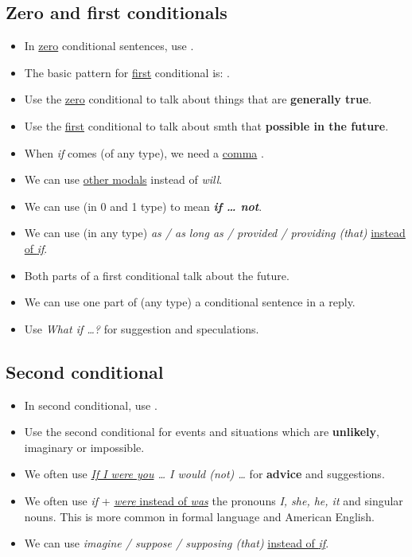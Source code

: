 \subsection{Zero and first conditionals}
\begin{itemize}
    \item In \underline{zero} conditional sentences, use .
    \item The basic pattern for \underline{first} conditional is:
    .
    \item Use the \underline{zero} conditional to talk about things that are \textbf{generally true}.
    \item Use the \underline{first} conditional to talk about smth that \textbf{possible in the future}.
    \item When \textit{if} comes  (of any type), we need a \underline{comma} .
    \item We can use \underline{other modals} instead of \textit{will}.
    \item We can use  (in 0 and 1 type) to mean \textbf{\textit{if \ldots{} not}}.
    \item[\doot] We can use (in any type) \textit{as / as long as / provided / providing (that)} \underline{instead of \textit{if}}.
    \item[\ast] Both parts of a first conditional talk about the future.
    \item[\aast] We can use one part of (any type) a conditional sentence in a reply.
    \item[\aast] Use \textit{What if \ldots{}?} for suggestion and speculations.
\end{itemize}

\subsection{Second conditional}
\begin{itemize}
    \item In second conditional, use .
    \item Use the second conditional for events and situations which are \textbf{unlikely}, imaginary or impossible.
    \item We often use \textit{\underline{If I were you} \ldots{} I would (not) \ldots} for \textbf{advice} and suggestions.
    \item We often use \textit{if} + \underline{\textit{were} instead of \textit{was}}
     the pronouns \textit{I, she, he, it} and singular nouns.
    This is more common in formal language and American English.
    \item[\doot] We can use \textit{imagine / suppose / supposing (that)} \underline{instead of \textit{if}}.
\end{itemize}

